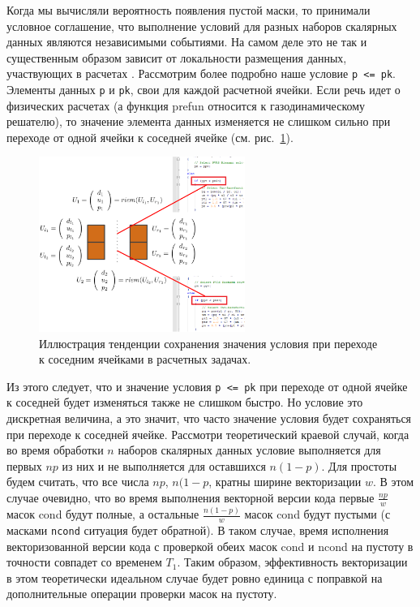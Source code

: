 Когда мы вычисляли вероятность появления пустой маски, то принимали условное соглашение, что выполнение условий для разных наборов скалярных данных являются независимыми событиями.
На самом деле это не так и существенным образом зависит от локальности размещения данных, участвующих в расчетах \cite{Rybakov2020VecMon}.
Рассмотрим более подробно наше условие \texttt{p <= pk}.
Элементы данных \texttt{p} и \texttt{pk}, свои для каждой расчетной ячейки.
Если речь идет о физических расчетах (а функция prefun относится к газодинамическому решателю), то значение элемента данных изменяется не слишком сильно при переходе от одной ячейки к соседней ячейке (см. рис.~\ref{fig:text_4_vec_comb_continuity}).

\begin{figure}[ht]
\centering
\includegraphics[width=0.6\textwidth]{./pics/text_4_vec_check_mask/continuity.png}
\singlespacing
{}\caption{Иллюстрация тенденции сохранения значения условия при переходе к соседним ячейками в расчетных задачах.}
\label{fig:text_4_vec_comb_continuity}
\end{figure}

Из этого следует, что и значение условия \texttt{p <= pk} при переходе от одной ячейке к соседней будет изменяться также не слишком быстро.
Но условие это дискретная величина, а это значит, что часто значение условия будет сохраняться при переходе к соседней ячейке.
Рассмотри теоретический краевой случай, когда во время обработки $n$ наборов скалярных данных условие выполняется для первых $np$ из них и не выполняется для оставшихся $n(1 - p)$.
Для простоты будем считать, что все числа $np$, $n(1 - p$, кратны ширине векторизации $w$.
В этом случае очевидно, что во время выполнения векторной версии кода первые $\frac{np}{w}$ масок cond будут полные, а остальные $\frac{n(1 - p)}{w}$ масок cond будут пустыми (с масками \texttt{ncond} ситуация будет обратной).
В таком случае, время исполнения векторизованной версии кода с проверкой обеих масок cond и ncond на пустоту в точности совпадет со временем $T_1$.
Таким образом, эффективность векторизации в этом теоретически идеальном случае будет ровно единица с поправкой на дополнительные операции проверки масок на пустоту.

